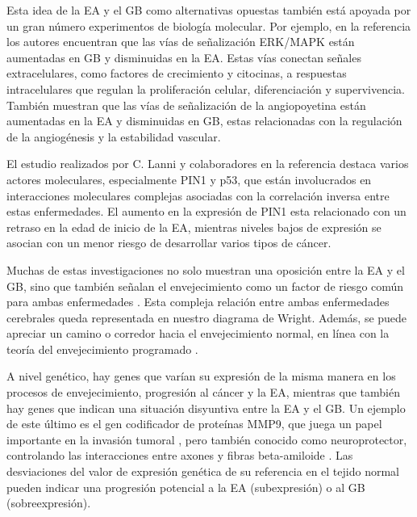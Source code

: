 Esta idea de la EA y el GB como alternativas opuestas también está apoyada por un gran número experimentos de biología molecular. Por ejemplo, en la referencia \cite{Liu_2013} los autores encuentran que las vías de señalización ERK/MAPK están aumentadas en GB y disminuidas en la EA. Estas vías conectan señales extracelulares, como factores de crecimiento y citocinas, a respuestas intracelulares que regulan la proliferación celular, diferenciación y supervivencia. También muestran que las vías de señalización de la angiopoyetina están aumentadas en la EA y disminuidas en GB, estas relacionadas con la regulación de la angiogénesis y la estabilidad vascular.

El estudio realizados por C. Lanni y colaboradores en la referencia \cite{Lanni_2020} destaca varios actores moleculares, especialmente PIN1 y p53, que están involucrados en interacciones moleculares complejas asociadas con la correlación inversa entre estas enfermedades. El aumento en la expresión de PIN1 esta relacionado con un retraso en la edad de inicio de la EA, mientras niveles bajos de expresión se asocian con un menor riesgo de desarrollar varios tipos de cáncer.

Muchas de estas investigaciones no solo muestran una oposición entre la EA y el GB, sino que también señalan el envejecimiento como un factor de riesgo común para ambas enfermedades \cite{Driver_2012, Musicco_2013 , Liu_2013, Lanni_2020, A_Driver_2010}. Esta compleja relación entre ambas enfermedades cerebrales queda representada en nuestro diagrama de Wright. Además, se puede apreciar un camino o corredor hacia el envejecimiento normal, en línea con la teoría del envejecimiento programado \cite{Magalh_es_2012, 	Gems_2022}.

A nivel genético, hay genes que varían su expresión de la misma manera en los procesos de envejecimiento, progresión al cáncer y la EA, mientras que también hay genes que indican una situación disyuntiva entre la EA y el GB. Un ejemplo de este último es el gen codificador de proteínas MMP9, que juega un papel importante en la invasión tumoral \cite{Choe2002, Xue_2017}, pero también conocido como neuroprotector, controlando las interacciones entre axones y fibras beta-amiloide \cite{Kaminari_2017}. Las desviaciones del valor de expresión genética de su referencia en el tejido normal pueden indicar una progresión potencial a la EA (subexpresión) o al GB (sobreexpresión).

